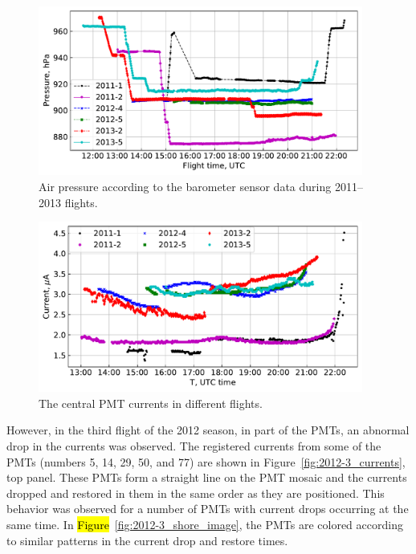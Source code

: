 \documentclass[universe,article,accept,moreauthors,pdftex]{Definitions/mdpi}
\begin{document}
\begin{figure}[H]    
        \includegraphics[width=0.95\textwidth]{Telemetry_pressure.pdf}
        \caption{Air pressure according to the barometer sensor data during 2011--2013 flights.}
        \label{fig:pressure}
\end{figure}
        \unskip
\begin{figure}[H]
        \includegraphics[width=0.95\textwidth]{hv-53.pdf}
        \caption{The central PMT currents in different flights.}
        \label{fig:current}
\end{figure}





However, in the third flight of the 2012 season, in part of the PMTs, an abnormal drop in the currents was observed. The registered currents from some of the PMTs (numbers 5, 14, 29, 50, and 77) are shown in Figure~\ref{fig:2012-3_currents}, top panel. These PMTs form a straight line on the PMT mosaic and the currents dropped and restored in them in the same order as they are positioned. This behavior was observed for a number of PMTs with current drops occurring at the same time. In \hl{Figure}~\ref{fig:2012-3_shore_image}, the PMTs are colored according to similar patterns in the current drop and restore times.%
\end{document}
